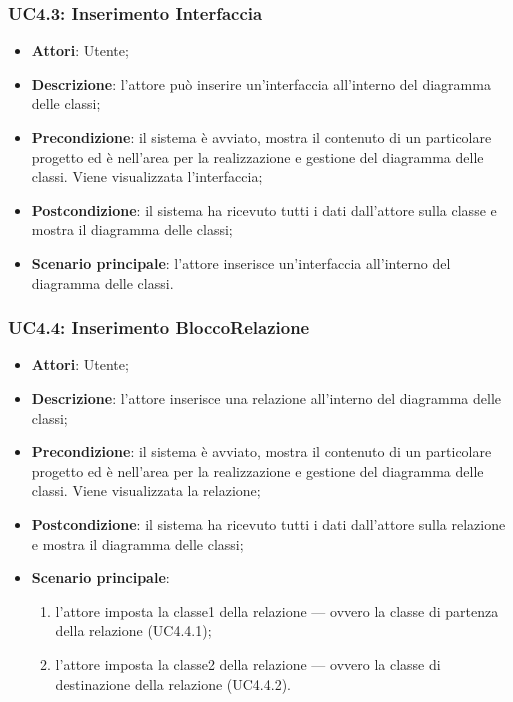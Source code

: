 \subsubsection{UC4.3: Inserimento Interfaccia}
\label{UC4.3}
\begin{itemize}
	\item \textbf{Attori}: Utente;
	\item \textbf{Descrizione}: l'attore può inserire un'interfaccia all'interno del diagramma delle classi;
	\item \textbf{Precondizione}: il sistema è avviato, mostra il contenuto di un particolare progetto ed è nell'area per la realizzazione e gestione del diagramma delle classi. Viene visualizzata l'interfaccia;
	\item \textbf{Postcondizione}: il sistema ha ricevuto tutti i dati dall'attore sulla classe e mostra il diagramma delle classi;
	\item \textbf{Scenario principale}: l'attore inserisce un'interfaccia all'interno del diagramma delle classi.
\end{itemize}

\subsubsection{UC4.4: Inserimento BloccoRelazione}
\label{UC4.4}
\begin{itemize}
	\item \textbf{Attori}: Utente;
	\item \textbf{Descrizione}: l'attore inserisce una relazione all'interno del diagramma delle classi;
	\item \textbf{Precondizione}: il sistema è avviato, mostra il contenuto di un particolare progetto ed è nell'area per la realizzazione e gestione del diagramma delle classi. Viene visualizzata la relazione;
	\item \textbf{Postcondizione}: il sistema ha ricevuto tutti i dati dall'attore sulla relazione e mostra il diagramma delle classi;
	\item \textbf{Scenario principale}:
	\begin{enumerate}
		\item l'attore imposta la classe1 della relazione --- ovvero la classe di partenza della relazione (UC4.4.1);
		\item l'attore imposta la classe2 della relazione --- ovvero la classe di destinazione della relazione (UC4.4.2).
	\end{enumerate}
\end{itemize}

